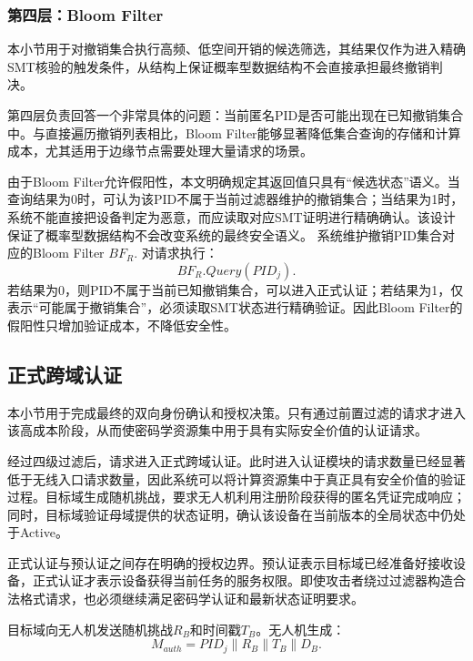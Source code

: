 \documentclass[conference]{IEEEtran}
\begin{document}
	\subsubsection{第四层：Bloom Filter}
	
	本小节用于对撤销集合执行高频、低空间开销的候选筛选，其结果仅作为进入精确SMT核验的触发条件，从结构上保证概率型数据结构不会直接承担最终撤销判决。
	
	第四层负责回答一个非常具体的问题：当前匿名PID是否可能出现在已知撤销集合中。与直接遍历撤销列表相比，Bloom Filter能够显著降低集合查询的存储和计算成本，尤其适用于边缘节点需要处理大量请求的场景。
	
	由于Bloom Filter允许假阳性，本文明确规定其返回值只具有“候选状态”语义。当查询结果为0时，可认为该PID不属于当前过滤器维护的撤销集合；当结果为1时，系统不能直接把设备判定为恶意，而应读取对应SMT证明进行精确确认。该设计保证了概率型数据结构不会改变系统的最终安全语义。
	系统维护撤销PID集合对应的Bloom Filter $BF_R$. 对请求执行：
	\begin{equation}
		BF_R.Query(PID_j).
	\end{equation}
	若结果为0，则PID不属于当前已知撤销集合，可以进入正式认证；若结果为1，仅表示“可能属于撤销集合”，必须读取SMT状态进行精确验证。因此Bloom Filter的假阳性只增加验证成本，不降低安全性。
	
	\subsection{正式跨域认证}
	
	本小节用于完成最终的双向身份确认和授权决策。只有通过前置过滤的请求才进入该高成本阶段，从而使密码学资源集中用于具有实际安全价值的认证请求。
	
	经过四级过滤后，请求进入正式跨域认证。此时进入认证模块的请求数量已经显著低于无线入口请求数量，因此系统可以将计算资源集中于真正具有安全价值的验证过程。目标域生成随机挑战，要求无人机利用注册阶段获得的匿名凭证完成响应；同时，目标域验证母域提供的状态证明，确认该设备在当前版本的全局状态中仍处于Active。
	
	正式认证与预认证之间存在明确的授权边界。预认证表示目标域已经准备好接收设备，正式认证才表示设备获得当前任务的服务权限。即使攻击者绕过过滤器构造合法格式请求，也必须继续满足密码学认证和最新状态证明要求。
	
	目标域向无人机发送随机挑战$R_B$和时间戳$T_B$。无人机生成：
	\begin{equation}
		M_{auth}=PID_j\parallel R_B\parallel T_B\parallel D_B.
	\end{equation}
	
\end{document}
